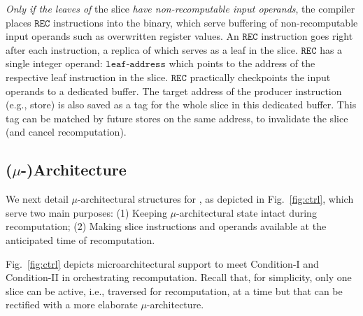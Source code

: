 {\em Only if the leaves of} the slice {\em have non-recomputable input operands},
the compiler places 
$\texttt{REC}$ instructions into the
binary, which serve buffering of non-recomputable input operands such as
overwritten register values.
An $\texttt{REC}$
instruction goes right after each instruction, a replica of which serves as a
leaf in the slice.  $\texttt{REC}$ has 
a single integer operand:
$\texttt{leaf-address}$ which points to the address of
the respective leaf instruction in the slice.  $\texttt{REC}$ practically checkpoints the input
operands 
to a dedicated buffer. 
{\color{magenta} The target address of the producer instruction (e.g., store) is also saved as a tag for the whole slice in this dedicated buffer. This tag can be matched by future stores on the same address, to invalidate the slice (and cancel recomputation).}

\subsection{($\mu$-)Architecture}
We next detail $\mu$-architectural structures for \arch, as depicted in Fig.~\ref{fig:ctrl}, which serve two main purposes:
(1) Keeping $\mu$-architectural state intact during recomputation; (2) Making 
slice instructions and operands available at the anticipated time of recomputation. 

Fig.~\ref{fig:ctrl} depicts microarchitectural support to meet  {
Condition-I} and {Condition-II} in orchestrating recomputation.  Recall
that, for simplicity, only one slice can be active, i.e., traversed for recomputation, at a
time but that can be rectified with a more elaborate $\mu$-architecture. 

